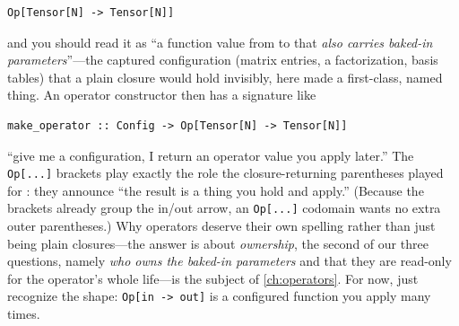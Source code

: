 \begin{lstlisting}[style=l4style]
Op[Tensor[N] -> Tensor[N]]
\end{lstlisting}

\noindent and you should read it as ``a function value from  to
 that \emph{also carries baked-in parameters}''---the captured
configuration (matrix entries, a factorization, basis tables) that a plain closure
would hold invisibly, here made a first-class, named thing. An operator
constructor then has a signature like

\begin{lstlisting}[style=l4style]
make_operator :: Config -> Op[Tensor[N] -> Tensor[N]]
\end{lstlisting}

\noindent ``give me a configuration, I return an operator value you apply later.''
The \lstinline[style=l4style]|Op[...]| brackets play exactly the role the
closure-returning parentheses played for : they announce ``the
result is a thing you hold and apply.'' (Because the brackets already group the
in/out arrow, an \lstinline[style=l4style]|Op[...]| codomain wants no extra outer
parentheses.) Why operators deserve their own spelling rather than just being
plain closures---the answer is about \emph{ownership}, the second of our three
questions, namely \emph{who owns the baked-in parameters} and that they are
read-only for the operator's whole life---is the subject of \cref{ch:operators}.
For now, just recognize the shape: \lstinline[style=l4style]|Op[in -> out]| is a
configured function you apply many times.

